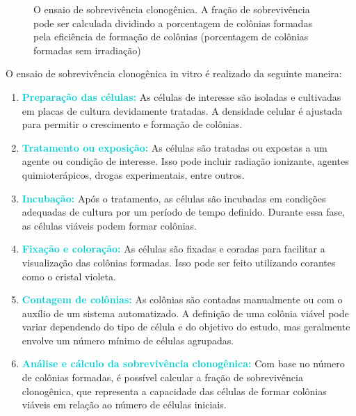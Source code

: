 \documentclass[11pt,a4paper]{article}
\begin{document}
	\begin{figure}[h]
		\centering
		\caption{O ensaio de sobrevivência clonogênica. A fração de sobrevivência pode ser calculada dividindo a porcentagem de colônias formadas pela eficiência de formação de colônias (porcentagem de colônias formadas sem irradiação)}
		\label{fig:fracaoDeSobrevivencia}
	\end{figure}

	O ensaio de sobrevivência clonogênica in vitro é realizado da seguinte maneira:

	\begin{enumerate}[label=\textcolor{CarnationPink}{\arabic*${}^\circ $}]
		\item \textcolor{DarkTurquoise}{\textbf{Preparação das células:}} As células de interesse são isoladas e cultivadas em placas de cultura devidamente tratadas. A densidade celular é ajustada para permitir o crescimento e formação de colônias.
		\item \textcolor{DarkTurquoise}{\textbf{Tratamento ou exposição:}} As células são tratadas ou expostas a um agente ou condição de interesse. Isso pode incluir radiação ionizante, agentes quimioterápicos, drogas experimentais, entre outros.
		\item \textcolor{DarkTurquoise}{\textbf{Incubação:}} Após o tratamento, as células são incubadas em condições adequadas de cultura por um período de tempo definido. Durante essa fase, as células viáveis podem formar colônias.
		\item \textcolor{DarkTurquoise}{\textbf{Fixação e coloração:}} As células são fixadas e coradas para facilitar a visualização das colônias formadas. Isso pode ser feito utilizando corantes como o cristal violeta.
		\item \textcolor{DarkTurquoise}{\textbf{Contagem de colônias:}} As colônias são contadas manualmente ou com o auxílio de um sistema automatizado. A definição de uma colônia viável pode variar dependendo do tipo de célula e do objetivo do estudo, mas geralmente envolve um número mínimo de células agrupadas.
		\item \textcolor{DarkTurquoise}{\textbf{Análise e cálculo da sobrevivência clonogênica:}} Com base no número de colônias formadas, é possível calcular a fração de sobrevivência clonogênica, que representa a capacidade das células de formar colônias viáveis em relação ao número de células iniciais.
	\end{enumerate}
\end{document}
